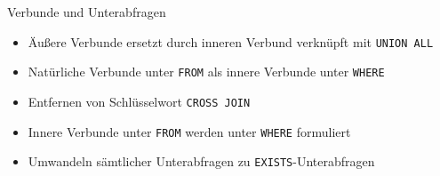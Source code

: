 \documentclass{beamer}
\begin{document}
   


%
%



\begin{frame}[fragile]{Verbunde und Unterabfragen}
\begin{itemize}
\item Äußere Verbunde ersetzt durch inneren Verbund verknüpft mit \verb|UNION ALL|
\item Natürliche Verbunde unter \verb|FROM| als innere Verbunde unter \verb|WHERE|
\item Entfernen von Schlüsselwort \verb|CROSS JOIN|
\item Innere Verbunde unter \verb|FROM| werden unter \verb|WHERE| formuliert
\item Umwandeln sämtlicher Unterabfragen zu \verb|EXISTS|-Unterabfragen 
\end{itemize}
\end{frame}
\end{document}
